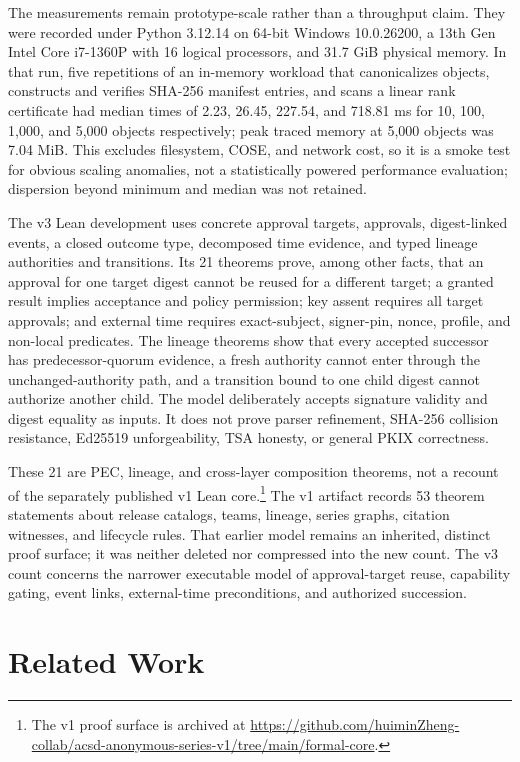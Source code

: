 \documentclass[11pt]{article}
\begin{document}
The measurements remain prototype-scale rather than a throughput claim. They
were recorded under Python 3.12.14 on 64-bit Windows 10.0.26200, a 13th Gen
Intel Core i7-1360P with 16 logical processors, and 31.7 GiB physical memory.
In that run, five repetitions of an in-memory workload that canonicalizes
objects, constructs and verifies SHA-256 manifest entries, and scans a linear
rank certificate had median times of 2.23, 26.45, 227.54, and 718.81 ms for
10, 100, 1,000, and 5,000 objects respectively; peak traced memory at 5,000
objects was 7.04 MiB. This excludes filesystem, COSE, and network cost, so it
is a smoke test for obvious scaling anomalies, not a statistically powered
performance evaluation; dispersion beyond minimum and median was not retained.

The v3 Lean development uses concrete approval targets, approvals, digest-linked
events, a closed outcome type, decomposed time evidence, and typed lineage
authorities and transitions. Its 21 theorems
prove, among other facts, that an approval for one target digest cannot be
reused for a different target; a granted result implies acceptance and policy
permission; key assent requires all target approvals; and external time
requires exact-subject, signer-pin, nonce, profile, and non-local predicates.
The lineage theorems show that every accepted successor has predecessor-quorum
evidence, a fresh authority cannot enter through the unchanged-authority path,
and a transition bound to one child digest cannot authorize another child.
The model deliberately accepts signature validity and digest equality as inputs.
It does not prove parser refinement, SHA-256 collision resistance, Ed25519
unforgeability, TSA honesty, or general PKIX correctness.

These 21 are PEC, lineage, and cross-layer composition theorems, not a recount of the
separately published v1 Lean core.\footnote{The v1 proof surface is archived at
\url{https://github.com/huiminZheng-collab/acsd-anonymous-series-v1/tree/main/formal-core}.}
The v1 artifact records 53 theorem statements
about release catalogs, teams, lineage, series graphs, citation witnesses, and
lifecycle rules. That earlier model remains an inherited, distinct proof
surface; it was neither deleted nor compressed into the new count. The v3
count concerns the narrower executable model of approval-target reuse,
capability gating, event links, external-time preconditions, and authorized
succession.

\section{Related Work}
\end{document}
